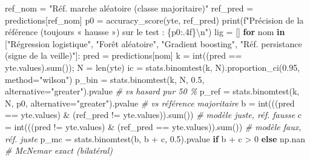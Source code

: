 \documentclass[
  10pt,
]{article}
\newenvironment{Shaded}{}{}
\newcommand{\BuiltInTok}[1]{\textcolor[rgb]{0.00,0.50,0.00}{#1}}
\newcommand{\CharTok}[1]{\textcolor[rgb]{0.25,0.44,0.63}{#1}}
\newcommand{\CommentTok}[1]{\textcolor[rgb]{0.38,0.63,0.69}{\textit{#1}}}
\newcommand{\ControlFlowTok}[1]{\textcolor[rgb]{0.00,0.44,0.13}{\textbf{#1}}}
\newcommand{\DecValTok}[1]{\textcolor[rgb]{0.25,0.63,0.44}{#1}}
\newcommand{\FloatTok}[1]{\textcolor[rgb]{0.25,0.63,0.44}{#1}}
\newcommand{\KeywordTok}[1]{\textcolor[rgb]{0.00,0.44,0.13}{\textbf{#1}}}
\newcommand{\NormalTok}[1]{#1}
\newcommand{\OperatorTok}[1]{\textcolor[rgb]{0.40,0.40,0.40}{#1}}
\newcommand{\SpecialCharTok}[1]{\textcolor[rgb]{0.25,0.44,0.63}{#1}}
\newcommand{\SpecialStringTok}[1]{\textcolor[rgb]{0.73,0.40,0.53}{#1}}
\newcommand{\StringTok}[1]{\textcolor[rgb]{0.25,0.44,0.63}{#1}}
\begin{document}
\begin{Shaded}
\begin{Highlighting}[]
\NormalTok{ref\_nom }\OperatorTok{=} \StringTok{"Réf. marche aléatoire (classe majoritaire)"}
\NormalTok{ref\_pred }\OperatorTok{=}\NormalTok{ predictions[ref\_nom]}
\NormalTok{p0 }\OperatorTok{=}\NormalTok{ accuracy\_score(yte, ref\_pred)}
\BuiltInTok{print}\NormalTok{(}\SpecialStringTok{f"Précision de la référence (toujours « hausse ») sur le test : }\SpecialCharTok{\{}\NormalTok{p0}\SpecialCharTok{:.4f\}}\CharTok{\textbackslash{}n}\SpecialStringTok{"}\NormalTok{)}
\NormalTok{lig }\OperatorTok{=}\NormalTok{ []}
\ControlFlowTok{for}\NormalTok{ nom }\KeywordTok{in}\NormalTok{ [}\StringTok{"Régression logistique"}\NormalTok{, }\StringTok{"Forêt aléatoire"}\NormalTok{, }\StringTok{"Gradient boosting"}\NormalTok{, }\StringTok{"Réf. persistance (signe de la veille)"}\NormalTok{]:}
\NormalTok{    pred }\OperatorTok{=}\NormalTok{ predictions[nom]}
\NormalTok{    k }\OperatorTok{=} \BuiltInTok{int}\NormalTok{((pred }\OperatorTok{==}\NormalTok{ yte.values).}\BuiltInTok{sum}\NormalTok{())}\OperatorTok{;}\NormalTok{ N }\OperatorTok{=} \BuiltInTok{len}\NormalTok{(yte)}
\NormalTok{    ic }\OperatorTok{=}\NormalTok{ stats.binomtest(k, N).proportion\_ci(}\FloatTok{0.95}\NormalTok{, method}\OperatorTok{=}\StringTok{"wilson"}\NormalTok{)}
\NormalTok{    p\_bin }\OperatorTok{=}\NormalTok{ stats.binomtest(k, N, }\FloatTok{0.5}\NormalTok{, alternative}\OperatorTok{=}\StringTok{"greater"}\NormalTok{).pvalue          }\CommentTok{\# vs hasard pur 50 \%}
\NormalTok{    p\_ref }\OperatorTok{=}\NormalTok{ stats.binomtest(k, N, p0, alternative}\OperatorTok{=}\StringTok{"greater"}\NormalTok{).pvalue           }\CommentTok{\# vs référence majoritaire}
\NormalTok{    b }\OperatorTok{=} \BuiltInTok{int}\NormalTok{(((pred }\OperatorTok{==}\NormalTok{ yte.values) }\OperatorTok{\&}\NormalTok{ (ref\_pred }\OperatorTok{!=}\NormalTok{ yte.values)).}\BuiltInTok{sum}\NormalTok{())          }\CommentTok{\# modèle juste, réf. fausse}
\NormalTok{    c }\OperatorTok{=} \BuiltInTok{int}\NormalTok{(((pred }\OperatorTok{!=}\NormalTok{ yte.values) }\OperatorTok{\&}\NormalTok{ (ref\_pred }\OperatorTok{==}\NormalTok{ yte.values)).}\BuiltInTok{sum}\NormalTok{())          }\CommentTok{\# modèle faux, réf. juste}
\NormalTok{    p\_mc }\OperatorTok{=}\NormalTok{ stats.binomtest(b, b }\OperatorTok{+}\NormalTok{ c, }\FloatTok{0.5}\NormalTok{).pvalue }\ControlFlowTok{if}\NormalTok{ b }\OperatorTok{+}\NormalTok{ c }\OperatorTok{\textgreater{}} \DecValTok{0} \ControlFlowTok{else}\NormalTok{ np.nan     }\CommentTok{\# McNemar exact (bilatéral)}

\end{Highlighting}
\end{Shaded}
\end{document}

